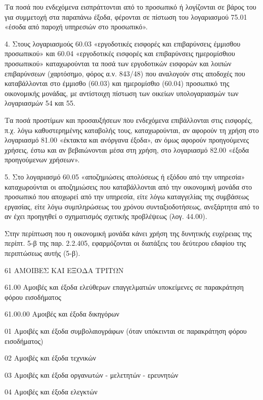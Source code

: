 \documentclass[A4,10pt,greek]{book}
\begin{document}
Τα ποσά που ενδεχόμενα εισπράττονται από το προσωπικό ή λογίζονται σε βάρος του για συμμετοχή στα παραπάνω έξοδα, φέρονται σε πίστωση του λογαριασμού 75.01 «έσοδα από παροχή υπηρεσιών στο προσωπικό».

4. Στους λογαριασμούς 60.03 «εργοδοτικές εισφορές και επιβαρύνσεις έμμισθου προσωπικού» και 60.04 «εργοδοτικές εισφορές και επιβαρύνσεις ημερομίσθιου προσωπικού» καταχωρούνται τα ποσά των εργοδοτικών εισφορών και λοιπών επιβαρύνσεων (χαρτόσημο, φόρος α.ν. 843/48) που αναλογούν στις αποδοχές που καταβάλλονται στο έμμισθο (60.03) και ημερομίσθιο (60.04) προσωπικό της οικονομικής μονάδας, με αντίστοιχη πίστωση των οικείων υπολογαριασμών των λογαριασμών 54 και 55.

Τα ποσά προστίμων και προσαυξήσεων που ενδεχόμενα επιβάλλονται στις εισφορές, π.χ. λόγω καθυστερημένης καταβολής τους, καταχωρούνται, αν αφορούν τη χρήση στο λογαριασμό 81.00 «έκτακτα και ανόργανα έξοδα», αν όμως αφορούν προηγούμενες χρήσεις, έστω και αν βεβαιώνονται μέσα στη χρήση, στο λογαριασμό 82.00 «έξοδα προηγούμενων χρήσεων».

5. Στο λογαριασμό 60.05 «αποζημιώσεις απολύσεως ή εξόδου από την υπηρεσία» καταχωρούνται οι αποζημιώσεις που καταβάλλονται από την οικονομική μονάδα στο προσωπικό που αποχωρεί από την υπηρεσία, είτε λόγω καταγγελίας της συμβάσεως εργασίας, είτε λόγω συμπληρώσεως του χρόνου συνταξιοδοτήσεως, ανεξάρτητα από το αν έχει προηγηθεί ο σχηματισμός σχετικής προβλέψεως (λογ. 44.00).

Στην περίπτωση που η οικονομική μονάδα κάνει χρήση της δυνητικής ευχέρειας της περίπτ. 5-β της παρ. 2.2.405, εφαρμόζονται οι διατάξεις του δεύτερου εδαφίου της περιπτώσεως αυτής (5-β).

 61   ΑΜΟΙΒΕΣ ΚΑΙ ΕΞΟΔΑ ΤΡΙΤΩΝ

        61.00   Αμοιβές και έξοδα ελεύθερων επαγγελματιών υποκείμενες σε
                     παρακράτηση φόρου εισοδήματος

                     61.00.00   Αμοιβές και έξοδα δικηγόρων

                                01   Αμοιβές και έξοδα συμβολαιογράφων (όταν υπόκεινται σε
                                        παρακράτηση φόρου εισοδήματος)

                                02   Αμοιβές και έξοδα τεχνικών

                                03   Αμοιβές και έξοδα οργανωτών - μελετητών - ερευνητών

                                04   Αμοιβές και έξοδα ελεγκτών
\end{document}
